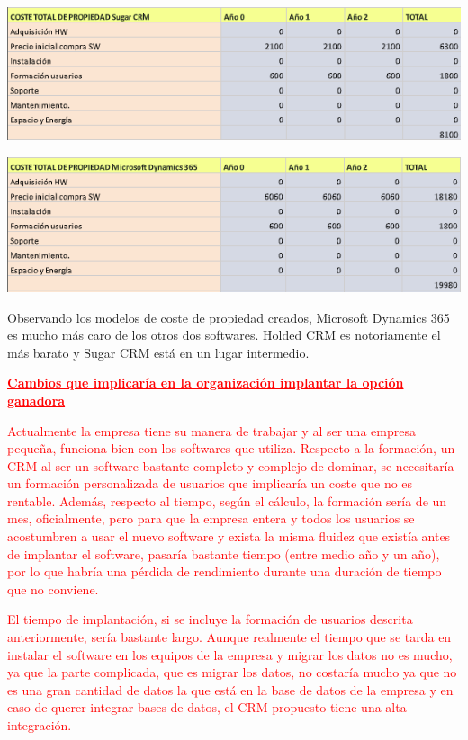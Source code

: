 \documentclass{article}
\begin{document}
\begin{center}
\includegraphics[scale=0.5]{images/sugar.png}
\end{center}

\begin{center}
\includegraphics[scale=0.5]{images/Microsoft.png}
\end{center}

Observando los modelos de coste de propiedad creados, Microsoft Dynamics 365 es mucho más caro de los otros dos softwares. Holded CRM es notoriamente el más barato y Sugar CRM está en un lugar intermedio.

\vspace{5mm}

\textcolor{Red}{\textbf{\underline{Cambios que implicaría en la organización implantar la opción ganadora}}}

\vspace{5mm}

\textcolor{Red}{Actualmente la empresa tiene su manera de trabajar y al ser una empresa pequeña, funciona bien con los softwares que utiliza.  Respecto a la formación, un CRM al ser un software bastante completo y complejo de dominar, se necesitaría un formación personalizada de usuarios que implicaría un coste que no es rentable. Además, respecto al tiempo, según el cálculo, la formación sería de un mes, oficialmente, pero para que la empresa entera y todos los usuarios se acostumbren a usar el nuevo software y exista la misma fluidez que existía antes de implantar el software, pasaría bastante tiempo (entre medio año y un año), por lo que habría una pérdida de rendimiento durante una duración de tiempo que no conviene.}

\textcolor{Red}{El tiempo de implantación, si se incluye la formación de usuarios descrita anteriormente, sería bastante largo. Aunque realmente el tiempo que se tarda en instalar el software en los equipos de la empresa y migrar los datos no es mucho, ya que la parte complicada, que es migrar los datos, no costaría mucho ya que no es una gran cantidad de datos la que está en la base de datos de la empresa y en caso de querer integrar bases de datos, el CRM propuesto tiene una alta integración. } 
\end{document}
